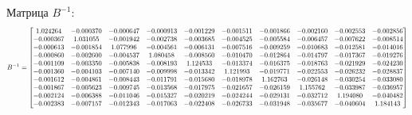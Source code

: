 \documentclass[14pt,a4paper]{scrartcl}
\newcommand\scalemath[2]{\scalebox{#1}{\mbox{\ensuremath{\displaystyle #2}}}}
\begin{document}
Матрица $B^{-1}$:
\begin{equation*}
\scalemath{0.65}
{
	B^{-1} = 
	\begin{bmatrix}{}
	1.024264 & -0.000370 & -0.000647 & -0.000913 & -0.001229 & -0.001511 & -0.001866 & -0.002160 & -0.002553 & -0.002856 \\ 
	-0.000367 & 1.031055 & -0.001942 & -0.002738 & -0.003685 & -0.004525 & -0.005584 & -0.006457 & -0.007622 & -0.008514 \\ 
	-0.000613 & -0.001854 & 1.077996 & -0.004561 & -0.006131 & -0.007516 & -0.009259 & -0.010683 & -0.012581 & -0.014016 \\ 
	-0.000860 & -0.002600 & -0.004537 & 1.080458 & -0.008560 & -0.010470 & -0.012864 & -0.014797 & -0.017367 & -0.019276 \\ 
	-0.001109 & -0.003350 & -0.005838 & -0.008193 & 1.124533 & -0.013374 & -0.016375 & -0.018763 & -0.021929 & -0.024230 \\ 
	-0.001360 & -0.004103 & -0.007140 & -0.009998 & -0.013342 & 1.121993 & -0.019771 & -0.022553 & -0.026232 & -0.028837 \\ 
	-0.001612 & -0.004861 & -0.008443 & -0.011791 & -0.015680 & -0.018978 & 1.162763 & -0.026148 & -0.030254 & -0.033080 \\ 
	-0.001867 & -0.005623 & -0.009745 & -0.013568 & -0.017975 & -0.021657 & -0.026159 & 1.155762 & -0.033987 & -0.036957 \\ 
	-0.002124 & -0.006388 & -0.011046 & -0.015327 & -0.020219 & -0.024244 & -0.029131 & -0.032712 & 1.194080 & -0.040482 \\ 
	-0.002383 & -0.007157 & -0.012343 & -0.017063 & -0.022408 & -0.026733 & -0.031948 & -0.035677 & -0.040604 & 1.184143 \\ 
	\end{bmatrix}
}
\end{equation*}
\end{document}
